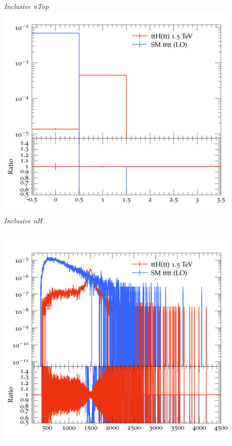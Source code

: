 \documentclass{beamer}
\begin{document}
\begin{frame}
\begin{columns}
\textit{\small Inclusive nTop}
\includegraphics[width=\textwidth]{../plots/ttH_1500/tttt_ttH/Inclusive_nH.png}\\
\textit{\small Inclusive nH}
\end{columns}
\begin{columns}
\includegraphics[width=\textwidth]{../plots/ttH_1500/tttt_ttH/Inclusive_InvM_ttbar12.png}\\

\end{columns}
\end{frame}
\end{document}
